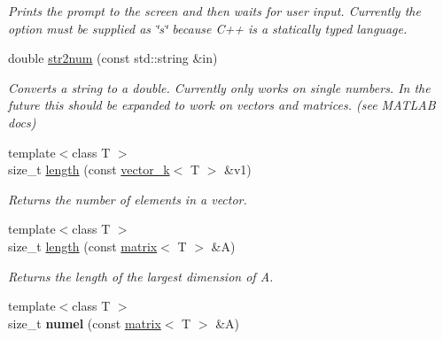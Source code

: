 \begin{DoxyCompactItemize}
\begin{DoxyCompactList}\small\item\em Prints the prompt to the screen and then waits for user input. Currently the option must be supplied as \char`\"{}s\char`\"{} because C++ is a statically typed language. \end{DoxyCompactList}\item 
\hypertarget{namespacekeycpp_a4bca7924aad17a920f2f5f0606e6d9a9}{double \hyperlink{namespacekeycpp_a4bca7924aad17a920f2f5f0606e6d9a9}{str2num} (const std\-::string \&in)}\label{namespacekeycpp_a4bca7924aad17a920f2f5f0606e6d9a9}

\begin{DoxyCompactList}\small\item\em Converts a string to a double. Currently only works on single numbers. In the future this should be expanded to work on vectors and matrices. (see M\-A\-T\-L\-A\-B docs) \end{DoxyCompactList}\item 
\hypertarget{namespacekeycpp_aa605bad9095a6c529656926dc4fb35cf}{{\footnotesize template$<$class T $>$ }\\size\-\_\-t \hyperlink{namespacekeycpp_aa605bad9095a6c529656926dc4fb35cf}{length} (const \hyperlink{classkeycpp_1_1vector__k}{vector\-\_\-k}$<$ T $>$ \&v1)}\label{namespacekeycpp_aa605bad9095a6c529656926dc4fb35cf}

\begin{DoxyCompactList}\small\item\em Returns the number of elements in a vector. \end{DoxyCompactList}\item 
\hypertarget{namespacekeycpp_a9c30ad952d4422425a171c12bdf33947}{{\footnotesize template$<$class T $>$ }\\size\-\_\-t \hyperlink{namespacekeycpp_a9c30ad952d4422425a171c12bdf33947}{length} (const \hyperlink{classkeycpp_1_1matrix}{matrix}$<$ T $>$ \&A)}\label{namespacekeycpp_a9c30ad952d4422425a171c12bdf33947}

\begin{DoxyCompactList}\small\item\em Returns the length of the largest dimension of A. \end{DoxyCompactList}\item 
\hypertarget{namespacekeycpp_adcbcd3d38aa0721f2556422eb06cad7d}{{\footnotesize template$<$class T $>$ }\\size\-\_\-t {\bfseries numel} (const \hyperlink{classkeycpp_1_1matrix}{matrix}$<$ T $>$ \&A)}\label{namespacekeycpp_adcbcd3d38aa0721f2556422eb06cad7d}


\end{DoxyCompactItemize}
